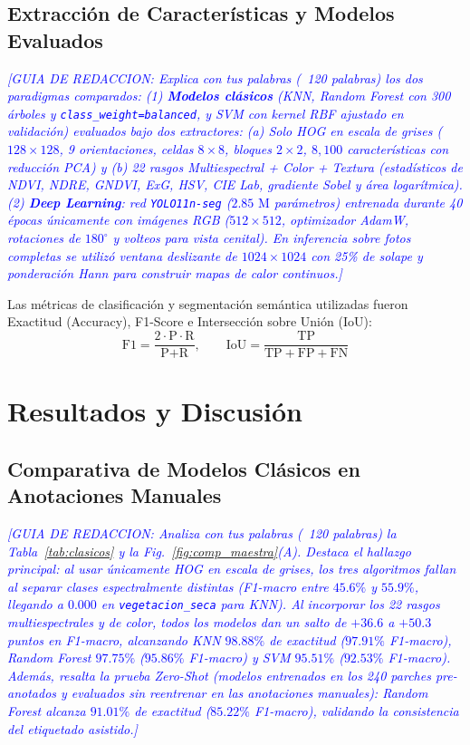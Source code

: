 \documentclass[conference]{IEEEtran}
\newcommand{\guia}[1]{\textcolor{blue}{\textit{[GUIA DE REDACCION: #1]}}}
\begin{document}
\subsection{Extracción de Características y Modelos Evaluados}
\guia{Explica con tus palabras (~120 palabras) los dos paradigmas comparados:
(1) \textbf{Modelos clásicos} (KNN, Random Forest con 300 árboles y \texttt{class\_weight=balanced}, y SVM con kernel RBF ajustado en validación) evaluados bajo dos extractores: (a) \emph{Solo HOG} en escala de grises ($128 \times 128$, 9 orientaciones, celdas $8\times8$, bloques $2\times2$, $8{,}100$ características con reducción PCA) y (b) \emph{22 rasgos Multiespectral + Color + Textura} (estadísticos de NDVI, NDRE, GNDVI, ExG, HSV, CIE Lab, gradiente Sobel y área logarítmica).
(2) \textbf{Deep Learning}: red \texttt{YOLO11n-seg} ($2.85\text{ M}$ parámetros) entrenada durante 40 épocas únicamente con imágenes RGB ($512\times512$, optimizador AdamW, rotaciones de $180^\circ$ y volteos para vista cenital). En inferencia sobre fotos completas se utilizó ventana deslizante de $1024\times1024$ con 25\% de solape y ponderación Hann para construir mapas de calor continuos.}

Las métricas de clasificación y segmentación semántica utilizadas fueron Exactitud (Accuracy), F1-Score e Intersección sobre Unión (IoU):
\begin{equation}
\text{F1} = \frac{2 \cdot \text{P} \cdot \text{R}}{\text{P} + \text{R}}, \qquad
\text{IoU} = \frac{\text{TP}}{\text{TP} + \text{FP} + \text{FN}}
\label{eq:f1_iou}
\end{equation}

\section{Resultados y Discusión}

\subsection{Comparativa de Modelos Clásicos en Anotaciones Manuales}
\guia{Analiza con tus palabras (~120 palabras) la Tabla~\ref{tab:clasicos} y la Fig.~\ref{fig:comp_maestra}(A). Destaca el hallazgo principal: al usar únicamente HOG en escala de grises, los tres algoritmos fallan al separar clases espectralmente distintas (F1-macro entre $45.6\%$ y $55.9\%$, llegando a $0.000$ en \texttt{vegetacion\_seca} para KNN). Al incorporar los 22 rasgos multiespectrales y de color, todos los modelos dan un salto de $+36.6$ a $+50.3$ puntos en F1-macro, alcanzando KNN $98.88\%$ de exactitud ($97.91\%$ F1-macro), Random Forest $97.75\%$ ($95.86\%$ F1-macro) y SVM $95.51\%$ ($92.53\%$ F1-macro). Además, resalta la prueba \emph{Zero-Shot} (modelos entrenados en los 240 parches pre-anotados y evaluados sin reentrenar en las anotaciones manuales): Random Forest alcanza $91.01\%$ de exactitud ($85.22\%$ F1-macro), validando la consistencia del etiquetado asistido.}
\end{document}
